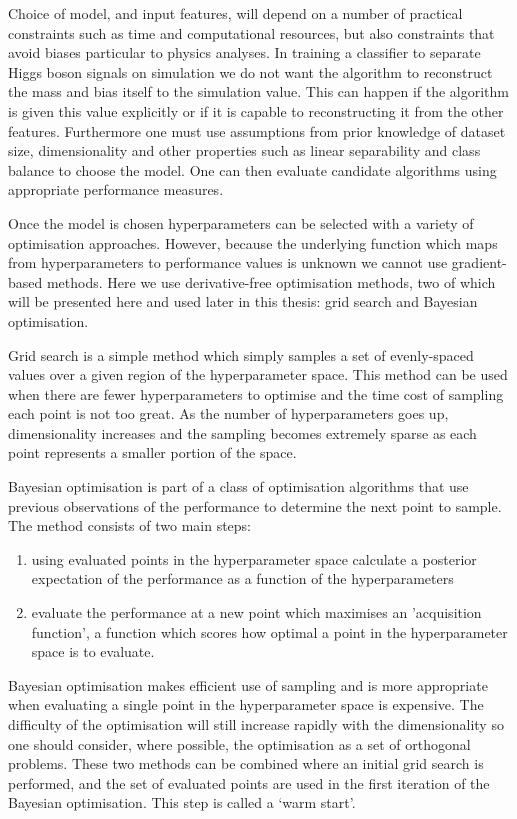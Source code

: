 Choice of model, and input features, will depend on a number of practical constraints such as time and computational resources, but also constraints that avoid biases particular to physics analyses. 
In training a classifier to separate Higgs boson signals on simulation we do not want the algorithm to reconstruct the mass and bias itself to the simulation value. This can happen if the algorithm is given this value explicitly or if it is capable to reconstructing it from the other features.  
Furthermore one must use assumptions from prior knowledge of dataset size, dimensionality and other properties such as linear separability and class balance to choose the model. One can then evaluate candidate algorithms using appropriate performance measures. 


Once the model is chosen hyperparameters can be selected with a variety of optimisation approaches. However, because the underlying function which maps from hyperparameters to performance values is unknown we cannot use gradient-based methods. Here we use derivative-free optimisation methods, two of which will be presented here and used later in this thesis: grid search and Bayesian optimisation.

Grid search is a simple method which simply samples a set of evenly-spaced values over a given region of the hyperparameter space. 
This method can be used when there are fewer hyperparameters to optimise and the time cost of sampling each point is not too great. 
As the number of hyperparameters goes up, dimensionality increases and the sampling becomes extremely sparse as each point represents a smaller portion of the space.

Bayesian optimisation \cite{BayesOpt} is part of a class of optimisation algorithms that use previous observations of the performance to determine the next point to sample. 
The method consists of two main steps:
\begin{enumerate}[leftmargin=.5in,noitemsep]
    \item using evaluated points in the hyperparameter space calculate a posterior expectation of the performance as a function of the hyperparameters
    \item evaluate the performance at a new point which maximises an 'acquisition function', a function which scores how optimal a point in the hyperparameter space is to evaluate. 
\end{enumerate}
Bayesian optimisation makes efficient use of sampling and is more appropriate when evaluating a single point in the hyperparameter space is expensive. The difficulty of the optimisation will still increase rapidly with the dimensionality so one should consider, where possible, the optimisation as a set of orthogonal problems.  
These two methods can be combined where an initial grid search is performed, and the set of evaluated points are used in the first iteration of the Bayesian optimisation. 
This step is called a `warm start'. 


